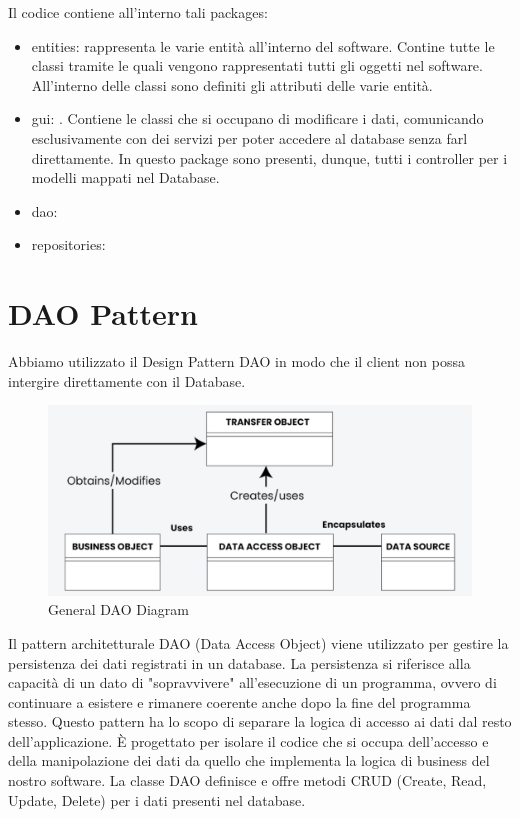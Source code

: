 \documentclass[twoside,openright,titlepage,fleqn,headinclude,12pt,a4paper,BCOR=5mm,footinclude]{scrbook}
\begin{document}
Il codice contiene all'interno tali packages:
\begin{itemize}
    \item entities: rappresenta le varie entità all'interno del software. Contine tutte le classi tramite le quali vengono rappresentati tutti gli oggetti nel software. All'interno delle classi sono definiti gli attributi delle varie entità.
    \item gui: . Contiene le classi che si occupano di modificare i dati, comunicando esclusivamente con dei servizi per poter accedere al database senza farl direttamente. In questo package sono presenti, dunque, tutti i controller per i modelli mappati nel Database.
 
    \item dao:

    \item repositories:

\end{itemize}

\section{DAO Pattern}
Abbiamo utilizzato il Design Pattern DAO in modo che il client non possa intergire direttamente con il Database.


\begin{figure}[H]
  \centering
  \includegraphics[width=\linewidth]{images/daoDiagram.png}
  \caption{General DAO Diagram}
  \label{fig:Dao Diagram}
\end{figure}



Il pattern architetturale DAO (Data Access Object) viene utilizzato per gestire la persistenza dei dati registrati in un database. La persistenza si riferisce alla capacità di un dato di "sopravvivere" all'esecuzione di un programma, ovvero di continuare a esistere e rimanere coerente anche dopo la fine del programma stesso. Questo pattern ha lo scopo di separare la logica di accesso ai dati dal resto dell'applicazione. È progettato per isolare il codice che si occupa dell'accesso e della manipolazione dei dati da quello che implementa la logica di business del nostro software. La classe DAO definisce e offre metodi CRUD (Create, Read, Update, Delete) per i dati presenti nel database.
\end{document}
